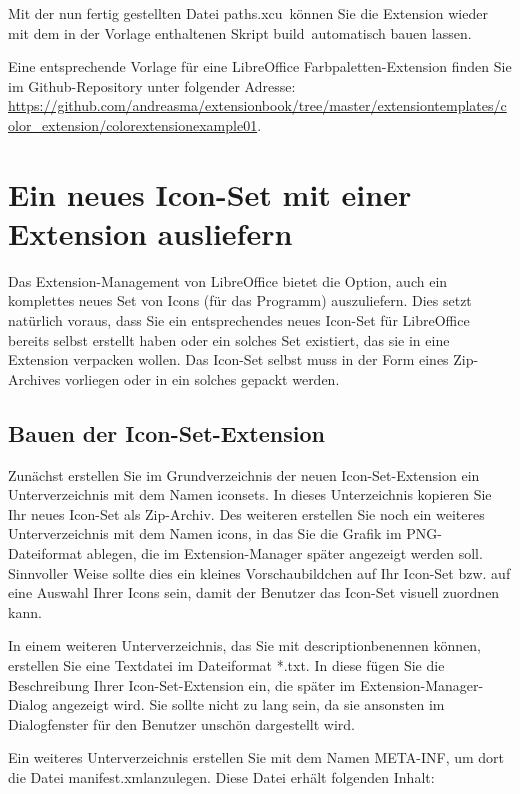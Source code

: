 \documentclass[a4paper,10pt,pagesize,titlepage]{scrbook}
\begin{document}
Mit der nun fertig gestellten Datei \glqq paths.xcu\grqq~können Sie die Extension wieder mit dem in der Vorlage enthaltenen Skript \glqq build\grqq~automatisch bauen lassen.

Eine entsprechende Vorlage für eine LibreOffice Farbpaletten-Extension finden Sie im Github-Repository unter folgender Adresse:
\url{https://github.com/andreasma/extensionbook/tree/master/extensiontemplates/color_extension/colorextensionexample01}.

\chapter{Ein neues Icon-Set mit einer Extension ausliefern}

Das Extension-Management von LibreOffice bietet die Option, auch ein komplettes neues Set von Icons (für das Programm) auszuliefern. Dies setzt natürlich voraus, dass Sie ein
entsprechendes neues Icon-Set für LibreOffice bereits selbst erstellt haben oder ein solches Set existiert, das sie in eine Extension verpacken wollen. Das Icon-Set selbst muss in der Form eines Zip-Archives vorliegen oder in ein solches gepackt werden.

\section{Bauen der Icon-Set-Extension}

Zunächst erstellen Sie im Grundverzeichnis der neuen Icon-Set-Extension ein Unterverzeichnis mit dem Namen \glqq iconsets\grqq. In dieses Unterzeichnis kopieren Sie Ihr neues Icon-Set als Zip-Archiv. Des weiteren erstellen Sie noch ein weiteres Unterverzeichnis mit dem Namen \glqq icons\grqq, in das Sie die Grafik im PNG-Dateiformat ablegen, die im Extension-Manager später angezeigt werden soll. Sinnvoller Weise sollte dies ein kleines Vorschaubildchen auf Ihr Icon-Set bzw. auf eine Auswahl Ihrer Icons sein, damit der Benutzer das Icon-Set visuell zuordnen 
kann.

In einem weiteren Unterverzeichnis, das Sie mit \glqq description\grqq benennen können, erstellen Sie eine Textdatei im Dateiformat *.txt. In diese fügen Sie die Beschreibung Ihrer Icon-Set-Extension ein, die später im Extension-Manager-Dialog angezeigt wird. Sie sollte nicht zu lang sein, da sie ansonsten im Dialogfenster für den Benutzer unschön dargestellt wird.

Ein weiteres Unterverzeichnis erstellen Sie mit dem Namen \glqq META-INF\grqq, um dort die Datei \glqq manifest.xml\grqq anzulegen. Diese Datei erhält folgenden Inhalt:
\end{document}
